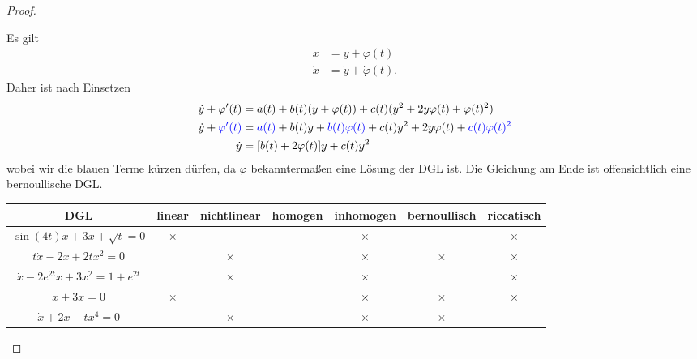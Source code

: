 \begin{proof}
\begin{parts}
\item Es gilt
	\begin{align*}
		x&=y+\varphi(t)\\
		\dot{x}&=\dot{y}+\dot{\varphi}(t).
	\end{align*}
	Daher ist nach Einsetzen
	\begin{align*}
		\dot{y}+\varphi'(t)&=a(t)+b(t)(y+\varphi(t))+c(t)(y^2+2y\varphi(t)+\varphi(t)^2) \\
		\dot{y}+\textcolor{blue}{\varphi'(t)}&=\textcolor{blue}{a(t)}+b(t)y+\textcolor{blue}{b(t)\varphi(t)}+c(t)y^2+2y\varphi(t)+\textcolor{blue}{c(t)\varphi(t)^2}\\
		\dot{y}&= [b(t)+2\varphi(t)]y + c(t)y^2
	\end{align*}
	wobei wir die blauen Terme kürzen dürfen, da $\varphi$ bekanntermaßen eine Lösung der DGL ist. Die Gleichung am Ende ist offensichtlich eine bernoullische DGL.
\item 

	\begin{tabular}{c|c|c|c|c|c|c}
	DGL & linear & nichtlinear & homogen & inhomogen & bernoullisch & riccatisch \\\hline
	$\sin(4t)x+3\dot{x}+\sqrt{t} =0$ & $\times$ & & & $\times $ & & $\times$ \\\hline
	$t\dot{x}-2x+2tx^2=0$ & & $\times$ & & $\times$ & $\times$ & $\times$ \\\hline
	$\dot{x}-2e^{2t}x+3x^2=1+e^{2t}$ & & $\times$ & & $\times$ & & $\times$ \\\hline
	$\dot{x}+3x=0$ & $\times$ & & & $\times$ & $\times$ & $\times$ \\\hline
	$\dot{x}+2x-tx^4=0$ & & $\times$ & & $\times$ & $\times$ & 
\end{tabular}
\end{parts}	
\end{proof}
